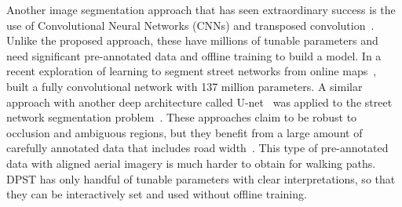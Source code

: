 Another image segmentation approach that has seen extraordinary success is the use of Convolutional Neural Networks (CNNs) and transposed convolution~\cite{Badrinarayanan2017-il, Noh2015-ni, Shelhamer2017-rf, Ronneberger2015-sv}. 
Unlike the proposed approach, these have millions of tunable parameters and need significant pre-annotated data and offline training to build a model. 
In a recent exploration of learning to segment street networks from online maps~\cite{Kaiser2017-np}, built a fully convolutional network with 137 million parameters.
A similar approach with another deep architecture called U-net~\cite{Ronneberger2015-sv} was applied to the street network segmentation problem~\cite{Zhang2017-gi}.
These approaches claim to be robust to occlusion and ambiguous regions, but they benefit from a large amount of carefully annotated data that includes road width~\cite{Mnih2013-dp}. 
This type of pre-annotated data with aligned aerial imagery is much harder to obtain for walking paths. 
\ac{DPST} has only handful of tunable parameters with clear interpretations, so that they can be interactively set and used without offline training.


